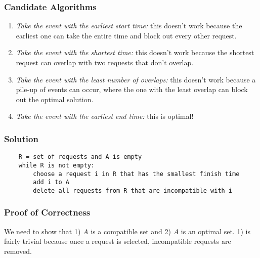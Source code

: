 \documentclass[11pt]{article}
\begin{document}
\subsubsection{Candidate Algorithms}
\begin{enumerate}
    \item \textit{Take the event with the earliest start time:} this doesn't work because the earliest one can take the entire time and block out every other request.
    \item \textit{Take the event with the shortest time:} this doesn't work because the shortest request can overlap with two requests that don't overlap.
    \item \textit{Take the event with the least number of overlaps:} this doesn't work because a pile-up of events can occur, where the one with the least overlap can block out the optimal solution.
    \item \textit{Take the event with the earliest end time:} this is optimal!
\end{enumerate}

\subsubsection{Solution}
\begin{verbatim}
    R = set of requests and A is empty
    while R is not empty:
        choose a request i in R that has the smallest finish time
        add i to A
        delete all requests from R that are incompatible with i
\end{verbatim}

\subsubsection{Proof of Correctness}
We need to show that 1) $A$ is a compatible set and 2) $A$ is an optimal set. 1) is fairly trivial because once a request is selected, incompatible requests are removed.
\end{document}
